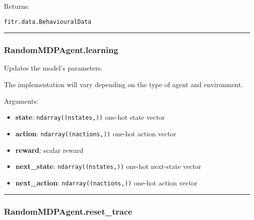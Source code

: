 Returns:

\texttt{fitr.data.BehaviouralData}

\begin{center}\rule{0.5\linewidth}{\linethickness}\end{center}

\subsubsection{RandomMDPAgent.learning}\label{randommdpagent.learning}

\begin{Shaded}
\begin{Highlighting}[]
\end{Highlighting}
\end{Shaded}

Updates the model's parameters.

The implementation will vary depending on the type of agent and
environment.

Arguments:

\begin{itemize}
\tightlist
\item
  \textbf{state}: \texttt{ndarray((nstates,))} one-hot state vector
\item
  \textbf{action}: \texttt{ndarray((nactions,))} one-hot action vector
\item
  \textbf{reward}: scalar reward
\item
  \textbf{next\_state}: \texttt{ndarray((nstates,))} one-hot next-state
  vector
\item
  \textbf{next\_action}: \texttt{ndarray((nactions,))} one-hot action
  vector
\end{itemize}

\begin{center}\rule{0.5\linewidth}{\linethickness}\end{center}

\subsubsection{RandomMDPAgent.reset\_trace}\label{randommdpagent.reset_trace}

\begin{Shaded}
\begin{Highlighting}[]
\OperatorTok{=}\NormalTok{)}
\end{Highlighting}
\end{Shaded}

